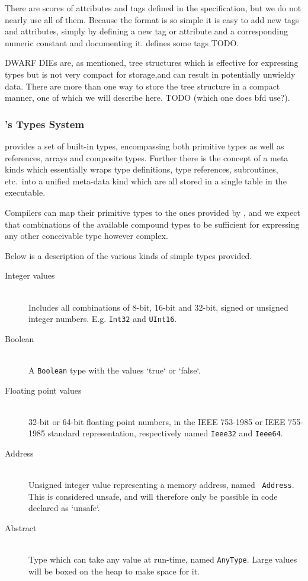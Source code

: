 There are scores of attributes and tags defined in the specification, but we do
not nearly use all of them. Because the format is so simple it is easy to add
new tags and attributes, simply by defining a new tag or attribute and a
corresponding numeric constant and documenting it. \thename{} defines some tags
TODO.

DWARF DIEs are, as mentioned, tree structures which is effective for expressing
types but is not very compact for storage,and can result in potentially unwieldy
data. There are more than one way to store the tree structure in a compact
manner, one of which we will describe here. TODO (which one does bfd use?).

\subsubsection{\thename{}'s Types System}

\thename{} provides a set of built-in types, encompassing both primitive types
as well as references, arrays and composite types. Further there is the concept
of a meta kinds which essentially wraps type definitions, type references,
subroutines, etc.~into a unified meta-data kind which are all stored in a single
table in the executable.

Compilers can map their primitive types to the ones provided by \thename{}, and
we expect that combinations of the available compound types to be sufficient for
expressing any other conceivable type however complex.

Below is a description of the various kinds of simple types provided.

\begin{description}
\item[Integer values] \hfill\\
  Includes all combinations of 8-bit, 16-bit and 32-bit, signed or unsigned
  integer numbers. E.g. {\tt Int32} and {\tt UInt16}.

\item[Boolean] \hfill\\
  A {\tt Boolean} type with the values `true` or `false`.

\item[Floating point values] \hfill\\
  32-bit or 64-bit floating point numbers, in the IEEE 753-1985 or IEEE 755-1985
  standard representation, respectively named {\tt Ieee32} and {\tt Ieee64}.

\item[Address] \hfill\\
  Unsigned integer value representing a memory address, named {\tt
    Address}. This is considered unsafe, and will therefore only be possible in
  code declared as `unsafe`.

\item[Abstract] \hfill\\
  Type which can take any value at run-time, named {\tt AnyType}. Large values
  will be boxed on the heap to make space for it.
\end{description}

